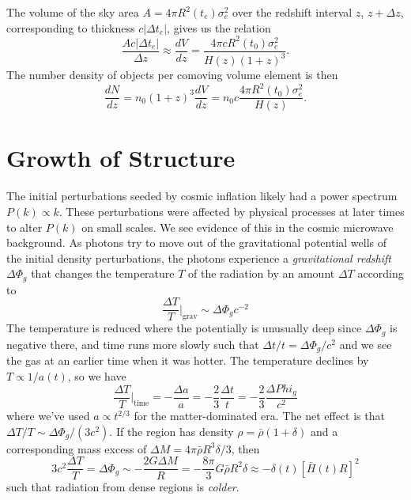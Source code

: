 \documentclass[]{article}
\begin{document}
The volume of the sky area $A = 4\pi R^2(t_e)\sigma_e^2$ over the redshift interval
$z$, $z+\Delta z$, corresponding to thickness $c |\Delta t_e|$, gives us the
relation
\begin{equation}
\frac{A c |\Delta t_e|}{\Delta z} \approx \frac{dV}{dz} = \frac{4\pi c R^2(t_0)\sigma_e^2}{H(z)(1+z)^3}.
\end{equation}
The number density of objects per comoving volume element is then
\begin{equation}
\frac{d N}{dz} = n_0(1+z)^3 \frac{dV}{dz} = n_0 c \frac{4 \pi R^2(t_0)\sigma_e^2}{H(z)}.
\end{equation}


\section{Growth of Structure}

The initial perturbations seeded by cosmic inflation likely had a
power spectrum $P(k) \propto k$.  These perturbations were affected
by physical processes at later times to alter $P(k)$ on small scales.
We see evidence of this in the cosmic microwave background. As
photons try to move out of the gravitational potential wells of the
initial density perturbations, the photons experience a 
{\it gravitational redshift} $\Delta\Phi_g$ that changes the
temperature $T$ of the radiation by an amount $\Delta T$ according
to
\begin{equation}
\frac{\Delta T}{T}|_{\mathrm{grav}} \sim \Delta \Phi_g c^{-2}
\end{equation}
\noindent
The temperature is reduced where the potentially
is unusually deep since $\Delta \Phi_g$ is negative
there, and time runs more slowly such that $\Delta t/t =\Delta \Phi_g/c^2$
and we see the gas at an earlier time when it was hotter.  The temperature
declines by $T\propto 1/ a(t)$, so we have
\begin{equation}
\frac{\Delta T}{T}|_{\mathrm{time}} = -\frac{\Delta a}{a} = -\frac{2}{3}\frac{\Delta t}{t} =  -\frac{2}{3}\frac{\Delta Phi_g}{c^2}
\end{equation}
\noindent
where we've used $a\propto t^{2/3}$ for the matter-dominated era.
The net effect is that $\Delta T/T \sim \Delta \Phi_g / (3 c^2)$.
If the region has density $\rho = \bar{\rho}(1+\delta)$ and a
corresponding mass excess of $\Delta M = 4\pi \bar{\rho}R^3 \delta / 3$,
then 
\begin{equation}
3c^2\frac{\Delta T}{T} = \Delta \Phi_g \sim - \frac{2G\Delta M}{R} = - \frac{8\pi}{3} G \bar{\rho}R^2 \delta \approx - \delta(t)[\bar{H}(t)R]^2
\end{equation}
\noindent
such that radiation from dense regions is {\it colder}.
\end{document}
